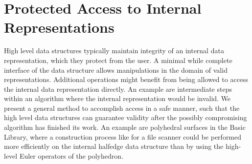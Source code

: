 
\section{Protected Access to Internal Representations}


High level data structures typically maintain integrity of an internal
data representation, which they protect from the user. A minimal while
complete interface of the data structure allows manipulations in the
domain of valid representations. Additional operations might benefit
from being allowed to access the internal data representation
directly. An example are intermediate steps within an algorithm where
the internal representation would be invalid. We present a general
method to accomplish access in a safe manner, such that the high level
data structures can guarantee validity after the possibly compromising
algorithm has finished its work. An example are polyhedral surfaces in
the Basic Library, where a construction process like for
a file scanner could be performed more efficiently on the internal
halfedge data structure than by using the high-level Euler operators
of the polyhedron.

